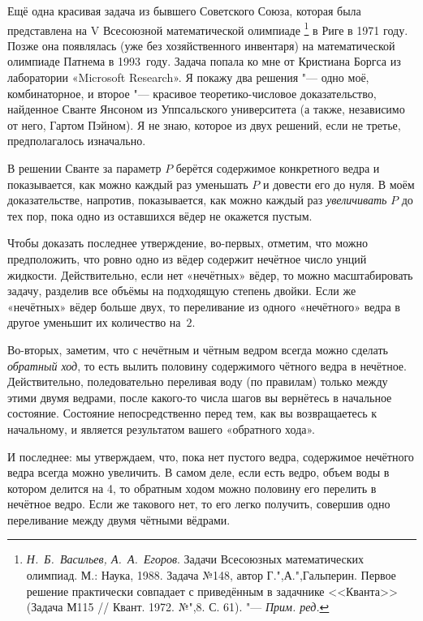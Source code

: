 \documentclass[twoside]{book}
\newcommand\VsMO{\emph{Н.~Б.~Васильев, А.~А.~Егоров}. Задачи Всесоюзных математических олимпиад. М.: Наука, 1988}
\begin{document}
Ещё одна красивая задача из бывшего Советского Союза, которая была представлена на V Всесоюзной математической олимпиаде%
\footnote{%
\VsMO. Задача №148, автор Г.",А.",Гальперин.
Первое решение практически совпадает с приведённым в задачнике <<Кванта>>  (Задача М115 /\!/ {Квант}. 1972. №",8. С. 61). "--- \emph{Прим. ред.}} в Риге в 1971 году.
Позже она появлялась (уже без хозяйственного инвентаря) на математической олимпиаде Патнема в 1993~году.
Задача попала ко мне от Кристиана Боргса из лаборатории «Microsoft Research». %
Я покажу два решения "--- одно моё, комбинаторное, и второе "---
красивое теоретико-числовое доказательство, найденное Сванте Янсоном
из Уппсальского университета
(а также, независимо от него, Гартом Пэйном). 
Я не знаю, которое из двух решений, если не третье, предполагалось изначально.

\medskip

В решении Сванте за параметр $P$ берётся содержимое конкретного ведра и показывается, как можно каждый раз уменьшать $P$ и довести его до нуля.
В моём доказательстве, напротив, показывается, как можно каждый раз \emph{увеличивать} $P$ до тех пор, пока одно из оставшихся вёдер не окажется пустым.

Чтобы доказать последнее утверждение, во-первых, отметим, что можно
предположить, что ровно одно из вёдер содержит нечётное число унций
жидкости.
Действительно, если нет «нечётных» вёдер, то можно
масштабировать задачу, разделив все объёмы на подходящую степень
двойки.
Если же «нечётных» вёдер больше двух, то переливание из
одного «нечётного» ведра в другое уменьшит их количество на~$2$.

Во-вторых, заметим, что с нечётным и чётным ведром всегда можно
сделать \emph{обратный ход}, то есть вылить половину содержимого
чётного ведра в нечётное.
Действительно, поледовательно переливая
воду (по правилам) только между этими двумя ведрами, после какого-то
числа шагов вы вернётесь в начальное состояние.
Состояние
непосредственно перед тем, как вы возвращаетесь к начальному, и
является результатом вашего «обратного хода».

И последнее: мы утверждаем, что, пока нет пустого ведра, содержимое
нечётного ведра всегда можно увеличить. В самом деле,
если есть ведро, объем воды в котором делится на 4, то обратным ходом можно половину его перелить в нечётное ведро.
Если же такового нет, то его легко получить, совершив одно переливание между двумя чётными вёдрами.
\heart
\end{document}
